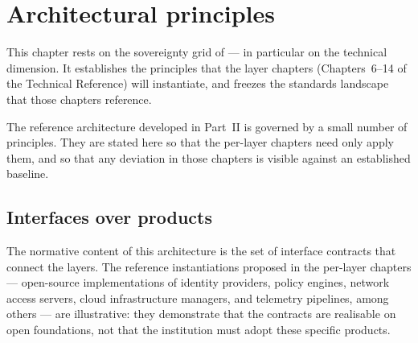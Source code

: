 
\chapter{Architectural principles}
\label{ch:architectural-principles}

\begin{caveatbox}[Dependencies]
\noindent This chapter rests on the sovereignty grid of
 --- in particular on the technical
dimension. It establishes the principles that the layer chapters
(Chapters~6--14 of the Technical Reference) will instantiate, and
freezes the standards landscape that those chapters reference.
\end{caveatbox}

The reference architecture developed in Part~II is governed by a small
number of principles. They are stated here so that the per-layer
chapters need only apply them, and so that any deviation in those
chapters is visible against an established baseline.

\section{Interfaces over products}
\label{sec:ap-interfaces}

The normative content of this architecture is the set of interface
contracts that connect the layers. The reference instantiations
proposed in the per-layer chapters --- open-source implementations of
identity providers, policy engines, network access servers, cloud
infrastructure managers, and telemetry pipelines, among others --- are
illustrative: they demonstrate that the contracts are realisable on
open foundations, not that the institution must adopt these specific
products.

